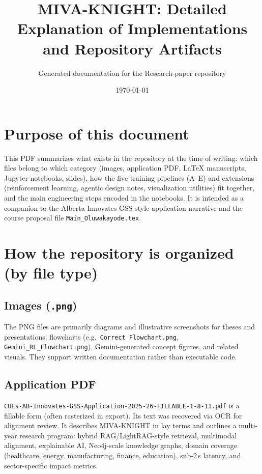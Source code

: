 \documentclass[11pt,a4paper]{article}
\title{\textbf{MIVA-KNIGHT: Detailed Explanation of Implementations and Repository Artifacts}}
\author{Generated documentation for the Research-paper repository}
\date{\today}
\begin{document}
\maketitle
\tableofcontents
\newpage

\section{Purpose of this document}
This PDF summarizes what exists in the repository at the time of writing: which files belong to which category (images, application PDF, \LaTeX{} manuscripts, Jupyter notebooks, slides), how the five training pipelines (A--E) and extensions (reinforcement learning, agentic design notes, visualization utilities) fit together, and the main engineering steps encoded in the notebooks. It is intended as a companion to the Alberta Innovates GSS-style application narrative and the course proposal file \texttt{Main\_Oluwakayode.tex}.

\section{How the repository is organized (by file type)}

\subsection{Images (\texttt{.png})}
The PNG files are primarily diagrams and illustrative screenshots for theses and presentations: flowcharts (e.g.\ \texttt{Correct Flowchart.png}, \texttt{Gemini\_RL\_Flowchart.png}), Gemini-generated concept figures, and related visuals. They support written documentation rather than executable code.

\subsection{Application PDF}
\texttt{CUEs-AB-Innovates-GSS-Application-2025-26-FILLABLE-1-8-11.pdf} is a fillable form (often rasterized in export). Its text was recovered via OCR for alignment review. It describes MIVA-KNIGHT in lay terms and outlines a multi-year research program: hybrid RAG/LightRAG-style retrieval, multimodal alignment, explainable AI, Neo4j-scale knowledge graphs, domain coverage (healthcare, energy, manufacturing, finance, education), sub-2\,s latency, and sector-specific impact metrics.
\end{document}
